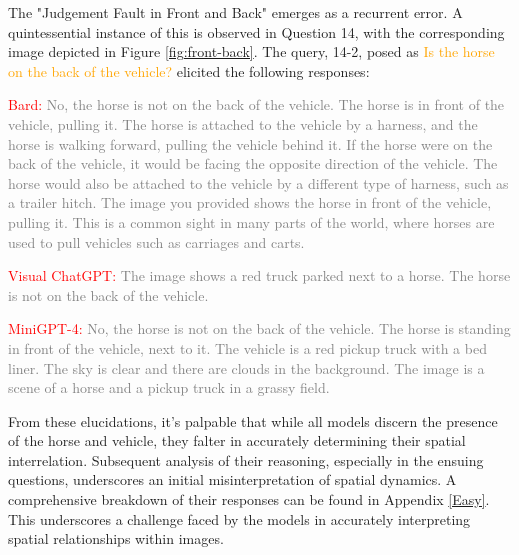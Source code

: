 \documentclass[twocolumn,11pt]{report}
\begin{document}
The "Judgement Fault in Front and Back" emerges as a recurrent error. A quintessential instance of this is observed in Question 14, with the corresponding image depicted in Figure \ref{fig:front-back}. The query, 14-2, posed as \textcolor{orange}{Is the horse on the back of the vehicle?} elicited the following responses:

\textcolor{red}{Bard:} \textcolor{gray}{No, the horse is not on the back of the vehicle. The horse is in front of the vehicle, pulling it. The horse is attached to the vehicle by a harness, and the horse is walking forward, pulling the vehicle behind it. If the horse were on the back of the vehicle, it would be facing the opposite direction of the vehicle. The horse would also be attached to the vehicle by a different type of harness, such as a trailer hitch. The image you provided shows the horse in front of the vehicle, pulling it. This is a common sight in many parts of the world, where horses are used to pull vehicles such as carriages and carts.}

\textcolor{red}{Visual ChatGPT:} \textcolor{gray}{The image shows a red truck parked next to a horse. The horse is not on the back of the vehicle.}

\textcolor{red}{MiniGPT-4:} \textcolor{gray}{No, the horse is not on the back of the vehicle. The horse is standing in front of the vehicle, next to it. The vehicle is a red pickup truck with a bed liner. The sky is clear and there are clouds in the background. The image is a scene of a horse and a pickup truck in a grassy field.}

From these elucidations, it's palpable that while all models discern the presence of the horse and vehicle, they falter in accurately determining their spatial interrelation. Subsequent analysis of their reasoning, especially in the ensuing questions, underscores an initial misinterpretation of spatial dynamics. A comprehensive breakdown of their responses can be found in Appendix \ref{Easy}. This underscores a challenge faced by the models in accurately interpreting spatial relationships within images.
\end{document}
